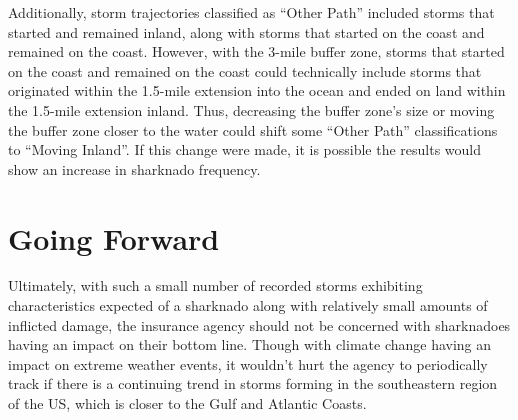 \documentclass[
  letterpaper,
  DIV=11,
  numbers=noendperiod]{scrreprt}
\begin{document}
Additionally, storm trajectories classified as ``Other Path'' included
storms that started and remained inland, along with storms that started
on the coast and remained on the coast. However, with the 3-mile buffer
zone, storms that started on the coast and remained on the coast could
technically include storms that originated within the 1.5-mile extension
into the ocean and ended on land within the 1.5-mile extension inland.
Thus, decreasing the buffer zone's size or moving the buffer zone closer
to the water could shift some ``Other Path'' classifications to ``Moving
Inland''. If this change were made, it is possible the results would
show an increase in sharknado frequency.

\section{Going Forward}\label{going-forward}

Ultimately, with such a small number of recorded storms exhibiting
characteristics expected of a sharknado along with relatively small
amounts of inflicted damage, the insurance agency should not be
concerned with sharknadoes having an impact on their bottom line. Though
with climate change having an impact on extreme weather events, it
wouldn't hurt the agency to periodically track if there is a continuing
trend in storms forming in the southeastern region of the US, which is
closer to the Gulf and Atlantic Coasts.
\end{document}
